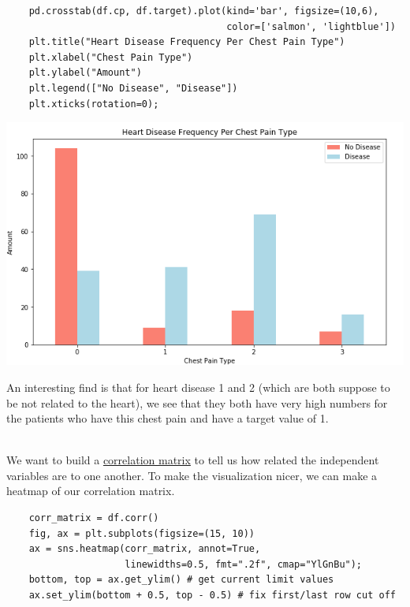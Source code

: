 \documentclass[11pt, a4paper]{article}
\begin{document}
\begin{spacing}{1.1}
\begin{lstlisting}
	pd.crosstab(df.cp, df.target).plot(kind='bar', figsize=(10,6), 
	                                   color=['salmon', 'lightblue'])
	plt.title("Heart Disease Frequency Per Chest Pain Type")
	plt.xlabel("Chest Pain Type")
	plt.ylabel("Amount")
	plt.legend(["No Disease", "Disease"])
	plt.xticks(rotation=0);	\end{lstlisting} \vspace*{1mm}
	\begin{minipage}[c]{9cm}
	\includegraphics[scale=.5]{bar_hd}
	\end{minipage}
	\begin{minipage}[c]{8cm}
	An interesting find is that for heart disease 1 and 2 (which are both suppose to be not related to the heart), we see that they both have very high numbers for the patients who have this chest pain and have a target value of 1. 
	\end{minipage} \vspace*{1mm} \\
	We want to build a \href{https://www.displayr.com/what-is-a-correlation-matrix/#:~:text=A\%20correlation\%20matrix\%20is\%20a,a\%20diagnostic\%20for\%20advanced\%20analyses.}{correlation matrix} to tell us how related the independent variables are to one another. To make the visualization nicer, we can make a heatmap of our correlation matrix. 
	\begin{lstlisting}
	corr_matrix = df.corr()
	fig, ax = plt.subplots(figsize=(15, 10))
	ax = sns.heatmap(corr_matrix, annot=True, 
	                 linewidths=0.5, fmt=".2f", cmap="YlGnBu");
	bottom, top = ax.get_ylim() # get current limit values
	ax.set_ylim(bottom + 0.5, top - 0.5) # fix first/last row cut off \end{lstlisting} \vspace*{1mm}

\end{spacing}
\end{document}
